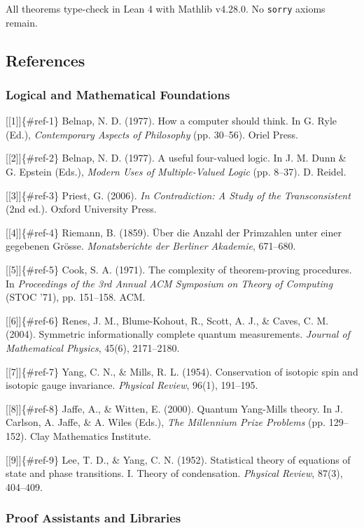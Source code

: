 \documentclass[10pt,a4paper]{article}
\begin{document}
All theorems type-check in Lean 4 with Mathlib v4.28.0. No \texttt{sorry} axioms remain.

\subsection{References}

\subsubsection{Logical and Mathematical Foundations}

{[}{[}1{]}{]}\{\#ref-1\} Belnap, N. D. (1977). How a computer should think. In G. Ryle (Ed.), \emph{Contemporary Aspects of Philosophy} (pp. 30--56). Oriel Press.

{[}{[}2{]}{]}\{\#ref-2\} Belnap, N. D. (1977). A useful four-valued logic. In J. M. Dunn \& G. Epstein (Eds.), \emph{Modern Uses of Multiple-Valued Logic} (pp. 8--37). D. Reidel.

{[}{[}3{]}{]}\{\#ref-3\} Priest, G. (2006). \emph{In Contradiction: A Study of the Transconsistent} (2nd ed.). Oxford University Press.

{[}{[}4{]}{]}\{\#ref-4\} Riemann, B. (1859). Über die Anzahl der Primzahlen unter einer gegebenen Grösse. \emph{Monatsberichte der Berliner Akademie}, 671--680.

{[}{[}5{]}{]}\{\#ref-5\} Cook, S. A. (1971). The complexity of theorem-proving procedures. In \emph{Proceedings of the 3rd Annual ACM Symposium on Theory of Computing} (STOC '71), pp. 151--158. ACM.

{[}{[}6{]}{]}\{\#ref-6\} Renes, J. M., Blume-Kohout, R., Scott, A. J., \& Caves, C. M. (2004). Symmetric informationally complete quantum measurements. \emph{Journal of Mathematical Physics}, 45(6), 2171--2180.

{[}{[}7{]}{]}\{\#ref-7\} Yang, C. N., \& Mills, R. L. (1954). Conservation of isotopic spin and isotopic gauge invariance. \emph{Physical Review}, 96(1), 191--195.

{[}{[}8{]}{]}\{\#ref-8\} Jaffe, A., \& Witten, E. (2000). Quantum Yang-Mills theory. In J. Carlson, A. Jaffe, \& A. Wiles (Eds.), \emph{The Millennium Prize Problems} (pp. 129--152). Clay Mathematics Institute.

{[}{[}9{]}{]}\{\#ref-9\} Lee, T. D., \& Yang, C. N. (1952). Statistical theory of equations of state and phase transitions. I. Theory of condensation. \emph{Physical Review}, 87(3), 404--409.

\subsubsection{Proof Assistants and Libraries}
\end{document}
